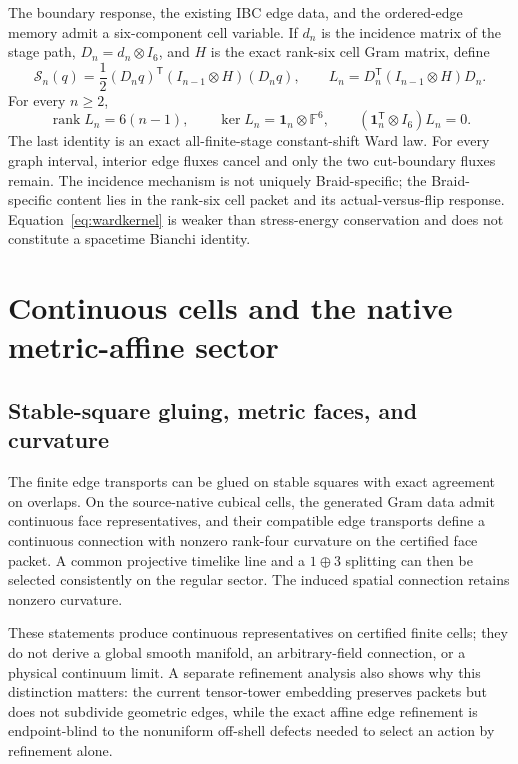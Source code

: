 \documentclass[11pt]{article}
\theoremstyle{definition}
\theoremstyle{remark}
\newcommand{\rank}{\operatorname{rank}}
\begin{document}
The boundary response, the existing IBC edge data, and the ordered-edge memory admit a six-component cell variable. If $d_n$ is the incidence matrix of the stage path, $D_n=d_n\otimes I_6$, and $H$ is the exact rank-six cell Gram matrix, define
\begin{equation}\label{eq:wardaction}
 \mathcal S_n(q)=\frac12(D_nq)^{\mathsf T}(I_{n-1}\otimes H)(D_nq),
 \qquad
 L_n=D_n^{\mathsf T}(I_{n-1}\otimes H)D_n.
\end{equation}
For every $n\ge2$,
\begin{equation}\label{eq:wardkernel}
 \rank L_n=6(n-1),\qquad
 \ker L_n=\mathbf1_n\otimes\mathbb F^6,
 \qquad
 (\mathbf1_n^{\mathsf T}\otimes I_6)L_n=0.
\end{equation}
The last identity is an exact all-finite-stage constant-shift Ward law. For every graph interval, interior edge fluxes cancel and only the two cut-boundary fluxes remain. The incidence mechanism is not uniquely Braid-specific; the Braid-specific content lies in the rank-six cell packet and its actual-versus-flip response. Equation~\eqref{eq:wardkernel} is weaker than stress-energy conservation and does not constitute a spacetime Bianchi identity.

\section{Continuous cells and the native metric-affine sector}

\subsection{Stable-square gluing, metric faces, and curvature}

The finite edge transports can be glued on stable squares with exact agreement on overlaps. On the source-native cubical cells, the generated Gram data admit continuous face representatives, and their compatible edge transports define a continuous connection with nonzero rank-four curvature on the certified face packet. A common projective timelike line and a $1\oplus3$ splitting can then be selected consistently on the regular sector. The induced spatial connection retains nonzero curvature.

These statements produce continuous representatives on certified finite cells; they do not derive a global smooth manifold, an arbitrary-field connection, or a physical continuum limit. A separate refinement analysis also shows why this distinction matters: the current tensor-tower embedding preserves packets but does not subdivide geometric edges, while the exact affine edge refinement is endpoint-blind to the nonuniform off-shell defects needed to select an action by refinement alone.
\end{document}
